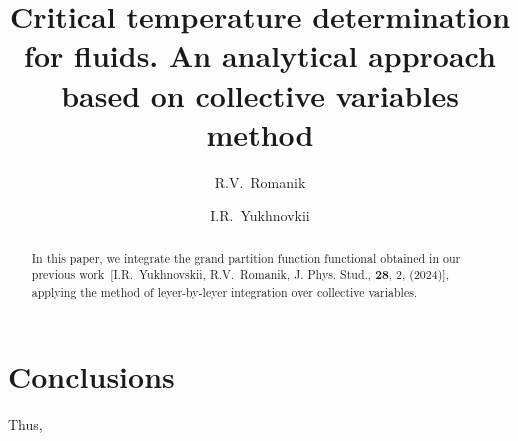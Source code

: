 \documentclass[fleqn,twoside,twocolumn,nofootinbib,showkeys]{revtex4} %
\begin{document}
\title[Critical temperature determination for fluids]%
{Critical temperature determination for fluids. An analytical approach based on collective variables method}%
\author{R.V.~Romanik}%
\address{1, Svientsitskii Str., Lviv 79011, Ukraine}%
\author{\hbox{I.R.~Yukhnovkii}}
%
\address{1, Svientsitskii Str., Lviv 79011, Ukraine}%

  \razd{\secvii}



\setcounter{page}{53}

\begin{abstract}
In this paper, we integrate the grand partition function functional obtained in our previous work~[I.R.~Yukhnovskii, R.V.~Romanik, J. Phys. Stud., {\bf 28}, 2, (2024)], applying the method of leyer-by-leyer integration over collective variables.
\end{abstract}


\maketitle









\section{Conclusions}

Thus, 

\appendix
\end{document}
